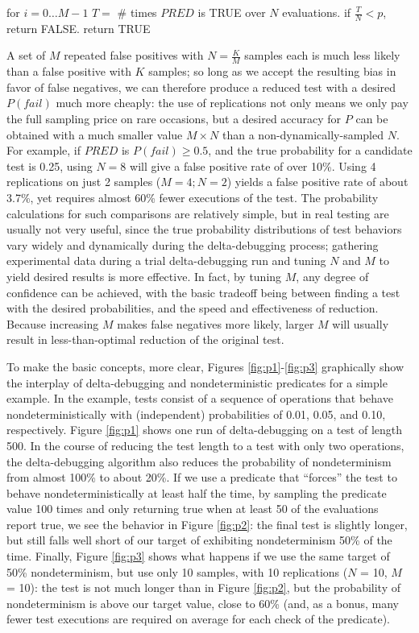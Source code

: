 {\scriptsize
\begin{code}
for $i = 0 \ldots M-1$
   $T =$ \# times $\mathit{PRED}$ is TRUE over $N$ evaluations.
   if $\frac{T}{N} < p$, return FALSE.
return TRUE
\end{code}
}

A set of $M$ repeated false positives with
$N = \frac{K}{M}$ samples each is much less likely than a false positive
with $K$ samples; so long as we accept the resulting bias in favor of
false negatives, we can therefore produce a reduced test with a
desired $P(\mathit{fail})$ much more cheaply:  the use of replications not only
means we only pay the full sampling price on rare occasions, but a
desired accuracy for $P$ can be obtained with a much smaller value $M
\times N$ than a non-dynamically-sampled $N$.  For example, if $\mathit{PRED}$
is $P(\mathit{fail}) \geq 0.5$, and the true probability for a candidate test
is 0.25, using $N=8$ will give a false positive rate of over 10\%.
Using 4 replications on just 2 samples ($M=4;N=2$) yields a false
positive rate of about 3.7\%, yet requires almost 60\% fewer
executions of the test.  The probability calculations for such comparisons are
relatively simple, but in real testing are
usually not very useful, since the true
probability distributions of test behaviors vary widely and
dynamically during the
delta-debugging process; gathering experimental data during a trial
delta-debugging run and tuning $N$ and $M$ to yield desired
results is  more effective.  In fact, by tuning $M$, any degree of confidence can be achieved, with
the basic tradeoff being between finding a test with the desired
probabilities, and the speed and effectiveness of reduction.
Because increasing $M$ makes false negatives more likely, larger $M$
will usually result in less-than-optimal reduction of the original
test.

To make the basic concepts, more clear, Figures
\ref{fig:p1}-\ref{fig:p3} graphically show the interplay of
delta-debugging and nondeterministic predicates for a simple example.
In the example, tests consist of a sequence of operations that behave
nondeterministically with (independent) probabilities of 0.01, 0.05,
and 0.10, respectively.  Figure \ref{fig:p1} shows one run of
delta-debugging on a test of length 500.  In
the course of reducing the test length to a test with only two
operations, the delta-debugging algorithm also reduces the probability
of nondeterminism from almost 100\% to about 20\%.  If we use a predicate that
``forces'' the test to behave nondeterministically at least half the
time, by sampling the predicate value 100 times and only returning
true when at least 50 of the evaluations report true, we see the
behavior in Figure \ref{fig:p2}:  the final test is slightly longer,
but still falls well short of our target of exhibiting nondeterminism
50\% of the time.  Finally, Figure \ref{fig:p3} shows what happens if
we use the same target of 50\% nondeterminism, but use only 10
samples, with 10 replications ($N$ = 10, $M$ = 10):  the test is not
much longer than in Figure \ref{fig:p2}, but the probability of
nondeterminism is above our target value, close to 60\% (and, as a bonus, many fewer
test executions are required on average for each check of the predicate).  